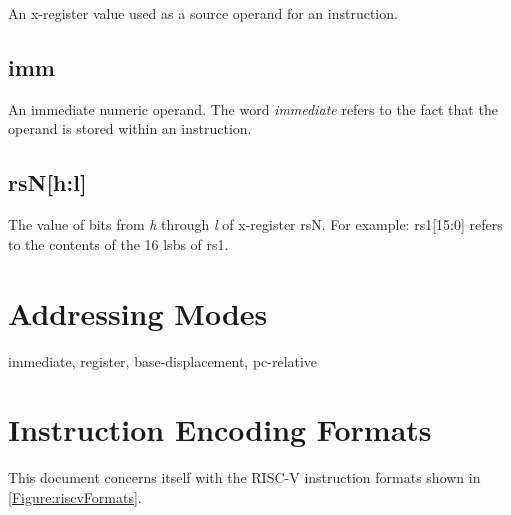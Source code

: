 An x-register value used as a source operand for an instruction.

\subsection{imm}

An immediate numeric operand.  The word {\em immediate} refers
to the fact that the operand is stored within an instruction.

\subsection{rsN[h:l]}

The value of bits from {\em h} through {\em l} of x-register rsN.
For example: rs1[15:0] refers to the contents of
the 16 \acrshort{lsb}s of rs1.

\section{Addressing Modes}

immediate, register, base-displacement, pc-relative


\section{Instruction Encoding Formats}
\label{section:EncodingFormats}



This document concerns itself with the RISC-V instruction formats shown
in \autoref{Figure:riscvFormats}.


